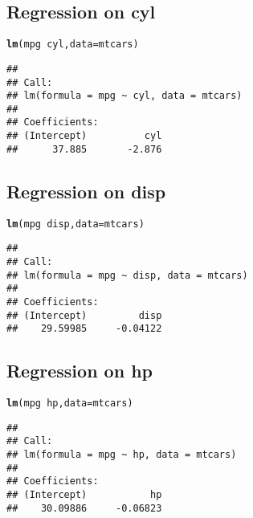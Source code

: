\documentclass{article}\usepackage[]{graphicx}\usepackage[]{color}
\makeatletter
\newcommand{\hlopt}[1]{\textcolor[rgb]{0,0,0}{#1}}%
\newcommand{\hlstd}[1]{\textcolor[rgb]{0.345,0.345,0.345}{#1}}%
\newcommand{\hlkwc}[1]{\textcolor[rgb]{0.333,0.667,0.333}{#1}}%
\newcommand{\hlkwd}[1]{\textcolor[rgb]{0.737,0.353,0.396}{\textbf{#1}}}%
\newenvironment{kframe}{%
 \def\at@end@of@kframe{}%
 \ifinner\ifhmode%
  \def\at@end@of@kframe{\end{minipage}}%
  \begin{minipage}{\columnwidth}%
 \fi\fi%
 \def\FrameCommand##1{\hskip\@totalleftmargin \hskip-\fboxsep
 \colorbox{shadecolor}{##1}\hskip-\fboxsep
     \hskip-\linewidth \hskip-\@totalleftmargin \hskip\columnwidth}%
 \MakeFramed {\advance\hsize-\width
   \@totalleftmargin\z@ \linewidth\hsize
   \@setminipage}}%
 {\par\unskip\endMakeFramed%
 \at@end@of@kframe}
\newenvironment{knitrout}{}{} %
\makeatother
\begin{document}
\subsection{Regression on cyl}
\begin{knitrout}
\color{fgcolor}\begin{kframe}
\begin{alltt}
\hlkwd{lm}\hlstd{(mpg}\hlopt{~}\hlstd{cyl,} \hlkwc{data}\hlstd{=mtcars)}
\end{alltt}
\begin{verbatim}
## 
## Call:
## lm(formula = mpg ~ cyl, data = mtcars)
## 
## Coefficients:
## (Intercept)          cyl  
##      37.885       -2.876
\end{verbatim}
\end{kframe}
\end{knitrout}
\subsection{Regression on disp}
\begin{knitrout}
\color{fgcolor}\begin{kframe}
\begin{alltt}
\hlkwd{lm}\hlstd{(mpg}\hlopt{~}\hlstd{disp,} \hlkwc{data}\hlstd{=mtcars)}
\end{alltt}
\begin{verbatim}
## 
## Call:
## lm(formula = mpg ~ disp, data = mtcars)
## 
## Coefficients:
## (Intercept)         disp  
##    29.59985     -0.04122
\end{verbatim}
\end{kframe}
\end{knitrout}
\subsection{Regression on hp}
\begin{knitrout}
\color{fgcolor}\begin{kframe}
\begin{alltt}
\hlkwd{lm}\hlstd{(mpg}\hlopt{~}\hlstd{hp,} \hlkwc{data}\hlstd{=mtcars)}
\end{alltt}
\begin{verbatim}
## 
## Call:
## lm(formula = mpg ~ hp, data = mtcars)
## 
## Coefficients:
## (Intercept)           hp  
##    30.09886     -0.06823
\end{verbatim}
\end{kframe}
\end{knitrout}
\end{document}
